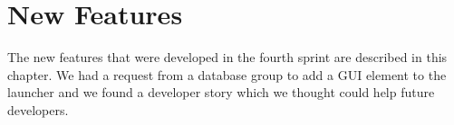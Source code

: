 
\chapter{New Features}
\label{cha:new_features}
The new features that were developed in the fourth sprint are described in this chapter. We had a request from a database group to add a GUI element to the launcher and we found a developer story which we thought could help future \giraf developers.




